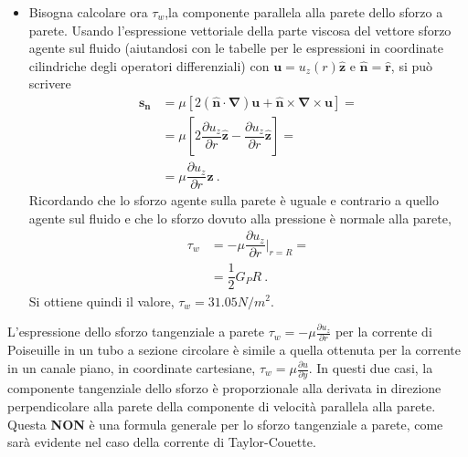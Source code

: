 \begin{itemize}
\item Bisogna calcolare ora $\tau_w$,la componente parallela alla parete dello sforzo a parete. Usando l'espressione vettoriale della parte viscosa del vettore sforzo agente sul fluido (aiutandosi con le tabelle per le espressioni in coordinate cilindriche degli operatori differenziali) con $\bm{u} = u_z(r)\bm{\hat{z}}$ e $\bm{\hat{n}} = \bm{\hat{r}}$, si può scrivere
\begin{equation}
\begin{aligned}
   \bm{s_n} & = \mu \left[ 2 (\bm{\hat{n}} \cdot \bm{\nabla} ) \bm{u} + \bm{\hat{n}} \times \bm{\nabla} \times \bm{u}  \right] = \\
            & = \mu \left[ 2 \dfrac{\partial u_z}{\partial r}\bm{\hat{z}} - \dfrac{\partial u_z}{\partial r} \bm{\hat{z}} \right] = \\
            & = \mu \dfrac{\partial u_z}{\partial r}\bm{\hat{z}} \ .
\end{aligned}
\end{equation}
%
Ricordando che lo sforzo agente sulla parete è uguale e contrario a quello agente sul fluido e che lo sforzo dovuto alla pressione è normale alla parete, 
\begin{equation}
\begin{aligned}
   \tau_w & = - \mu \dfrac{\partial u_z}{\partial r}\bigg|_{r=R} = \\
          & = \dfrac{1}{2} G_P R \ .
\end{aligned}
\end{equation}
%
Si ottiene quindi il valore, $\tau_w = 31.05 N/m^2$.
\end{itemize}

\begin{remark}
 L'espressione dello sforzo tangenziale a parete $\tau_w = - \mu \frac{\partial u_z}{\partial r}$ per la corrente di Poiseuille in un tubo a sezione circolare è simile a quella ottenuta per la corrente in un canale piano, in coordinate cartesiane, $\tau_w = \mu \frac{\partial u}{\partial y}$. In questi due casi, la componente tangenziale dello sforzo è proporzionale alla derivata in direzione perpendicolare alla parete della componente di velocità parallela alla parete. Questa \textbf{NON} è una formula generale per lo sforzo tangenziale a parete, come sarà evidente nel caso della corrente di Taylor-Couette.
\end{remark}

